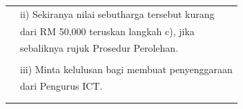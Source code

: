 \documentclass[
]{article}
\begin{document}
\begin{longtable}[]{@{}ll@{}}
\begin{minipage}[t]{0.23\columnwidth}\raggedright
\strut
\end{minipage} & \begin{minipage}[t]{0.71\columnwidth}\raggedright
ii) Sekiranya nilai sebutharga tersebut kurang\strut
\end{minipage}\tabularnewline
\begin{minipage}[t]{0.23\columnwidth}\raggedright
\strut
\end{minipage} & \begin{minipage}[t]{0.71\columnwidth}\raggedright
dari RM 50,000 teruskan langkah c), jika\strut
\end{minipage}\tabularnewline
\begin{minipage}[t]{0.23\columnwidth}\raggedright
\strut
\end{minipage} & \begin{minipage}[t]{0.71\columnwidth}\raggedright
sebaliknya rujuk Prosedur Perolehan.\strut
\end{minipage}\tabularnewline
\begin{minipage}[t]{0.23\columnwidth}\raggedright
\strut
\end{minipage} & \begin{minipage}[t]{0.71\columnwidth}\raggedright
\strut
\end{minipage}\tabularnewline
\begin{minipage}[t]{0.23\columnwidth}\raggedright
\strut
\end{minipage} & \begin{minipage}[t]{0.71\columnwidth}\raggedright
iii) Minta kelulusan bagi membuat penyenggaraan\strut
\end{minipage}\tabularnewline
\begin{minipage}[t]{0.23\columnwidth}\raggedright
\strut
\end{minipage} & \begin{minipage}[t]{0.71\columnwidth}\raggedright
dari Pengurus ICT.\strut
\end{minipage}\tabularnewline
\begin{minipage}[t]{0.23\columnwidth}\raggedright
\strut
\end{minipage} & \begin{minipage}[t]{0.71\columnwidth}\raggedright
\strut
\end{minipage}\tabularnewline
\begin{minipage}[t]{0.23\columnwidth}\raggedright
\strut
\end{minipage} & \begin{minipage}[t]{0.71\columnwidth}\raggedright

\end{minipage}
\end{longtable}
\end{document}
